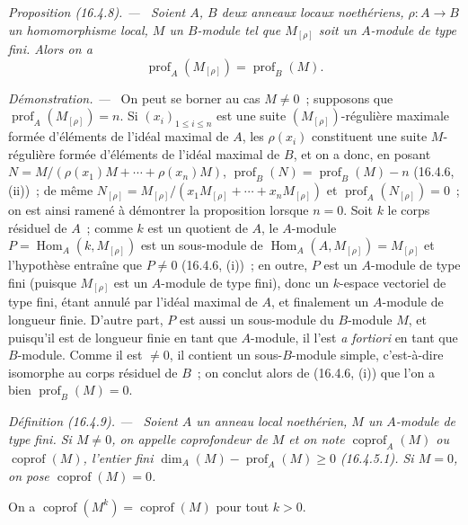 \documentclass[10pt,oneside]{book}
\makeatletter
\newcommand{\setmanualcurrentlabel}[1]{\def\@currentlabel{#1}}
\newenvironment{definition}[1][]{%
  \setmanualcurrentlabel{#1}\par\medskip\noindent\itshape Définition (#1). ---\ }{\par}
\newenvironment{proposition}[1][]{%
  \setmanualcurrentlabel{#1}\par\medskip\noindent\itshape Proposition (#1). ---\ }{\par}
\newenvironment{proof}{%
  \par\medskip\noindent\textit{Démonstration. ---\ }}{\par}
\makeatother
\begin{document}
\begin{proposition}[16.4.8]
\label{0.16.4.8-fr}
Soient $A$, $B$ deux anneaux locaux noethériens,
$\rho:A\to B$ un homomorphisme local, $M$ un $B$-module tel que
$M_{[\rho]}$ soit un $A$-module de type fini. Alors on a
\begin{equation}
\label{0.16.4.8.1-fr}
\tag{16.4.8.1}
  \operatorname{prof}_A(M_{[\rho]})=\operatorname{prof}_B(M).
\end{equation}
\end{proposition}

\begin{proof}
On peut se borner au cas $M\neq0$~; supposons que
$\operatorname{prof}_A(M_{[\rho]})=n$. Si $(x_i)_{1\leq i\leq n}$ est une
suite $(M_{[\rho]})$-régulière maximale formée d'éléments de l'idéal maximal
de $A$, les $\rho(x_i)$ constituent une suite $M$-régulière formée d'éléments
de l'idéal maximal de $B$, et on a donc, en posant
$N=M/(\rho(x_1)M+\cdots+\rho(x_n)M)$,
$\operatorname{prof}_B(N)=\operatorname{prof}_B(M)-n$ (16.4.6, (ii))~; de
même
$N_{[\rho]}=M_{[\rho]}/(x_1M_{[\rho]}+\cdots+x_nM_{[\rho]})$ et
$\operatorname{prof}_A(N_{[\rho]})=0$~; on est ainsi ramené à démontrer la
proposition lorsque $n=0$. Soit $k$ le corps résiduel de $A$~; comme $k$ est
un quotient de $A$, le $A$-module
$P=\operatorname{Hom}_A(k,M_{[\rho]})$ est un sous-module de
$\operatorname{Hom}_A(A,M_{[\rho]})=M_{[\rho]}$ et l'hypothèse entraîne que
$P\neq0$ (16.4.6, (i))~; en outre, $P$ est un $A$-module de type fini
(puisque $M_{[\rho]}$ est un $A$-module de type fini), donc un $k$-espace
vectoriel de type fini, étant annulé par l'idéal maximal de $A$, et finalement
un $A$-module de longueur finie. D'autre part, $P$ est aussi un sous-module du
$B$-module $M$, et puisqu'il est de longueur finie en tant que $A$-module, il
l'est \emph{a fortiori} en tant que $B$-module. Comme il est $\neq0$, il
contient un sous-$B$-module simple, c'est-à-dire isomorphe au corps résiduel de
$B$~; on conclut alors de (16.4.6, (i)) que l'on a bien
$\operatorname{prof}_B(M)=0$.
\end{proof}

\begin{definition}[16.4.9]
\label{0.16.4.9-fr}
Soient $A$ un anneau local noethérien, $M$ un $A$-module de type fini. Si
$M\neq0$, on appelle \emph{coprofondeur} de $M$ et on note
$\operatorname{coprof}_A(M)$ ou $\operatorname{coprof}(M)$, l'entier fini
$\dim_A(M)-\operatorname{prof}_A(M)\geq0$ (16.4.5.1). Si $M=0$, on pose
$\operatorname{coprof}(M)=0$.

On a $\operatorname{coprof}(M^k)=\operatorname{coprof}(M)$ pour tout $k>0$.
\end{definition}
\end{document}
